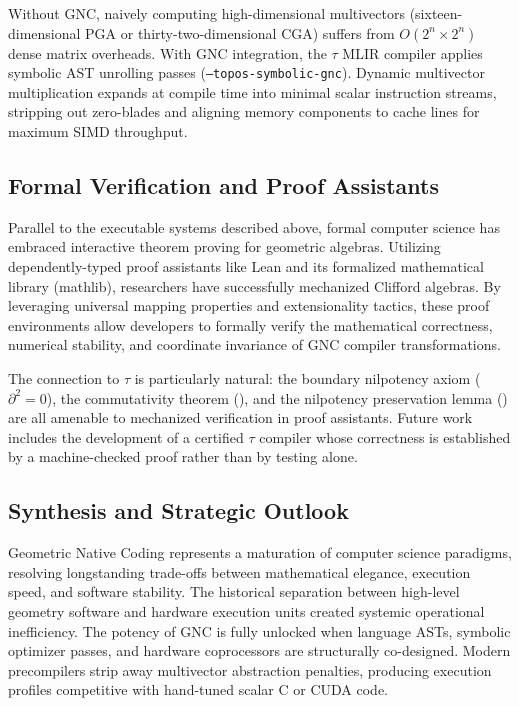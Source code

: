 \documentclass[manuscript, nonacm, review=false]{acmart}
\theoremstyle{definition}
\theoremstyle{plain}
\newcommand{\toposLang}{\ensuremath{\tau}\text{-Lang}}
\begin{document}
Without GNC, naively computing high-dimensional multivectors (sixteen-dimensional PGA or thirty-two-dimensional CGA) suffers from $O(2^n \times 2^n)$ dense matrix overheads. With GNC integration, the \toposLang{} MLIR compiler applies symbolic AST unrolling passes (\texttt{--topos-symbolic-gnc}). Dynamic multivector multiplication expands at compile time into minimal scalar instruction streams, stripping out zero-blades and aligning memory components to cache lines for maximum SIMD throughput.


\subsection{Formal Verification and Proof Assistants}
\label{subsec:formal_verification}

Parallel to the executable systems described above, formal computer science has embraced interactive theorem proving for geometric algebras. Utilizing dependently-typed proof assistants like Lean and its formalized mathematical library (mathlib), researchers have successfully mechanized Clifford algebras. By leveraging universal mapping properties and extensionality tactics, these proof environments allow developers to formally verify the mathematical correctness, numerical stability, and coordinate invariance of GNC compiler transformations.

The connection to \toposLang{} is particularly natural: the boundary nilpotency axiom ($\partial^2 = 0$), the commutativity theorem (), and the nilpotency preservation lemma () are all amenable to mechanized verification in proof assistants. Future work includes the development of a certified \toposLang{} compiler whose correctness is established by a machine-checked proof rather than by testing alone.


\subsection{Synthesis and Strategic Outlook}
\label{subsec:strategic_outlook}

Geometric Native Coding represents a maturation of computer science paradigms, resolving longstanding trade-offs between mathematical elegance, execution speed, and software stability. The historical separation between high-level geometry software and hardware execution units created systemic operational inefficiency. The potency of GNC is fully unlocked when language ASTs, symbolic optimizer passes, and hardware coprocessors are structurally co-designed. Modern precompilers strip away multivector abstraction penalties, producing execution profiles competitive with hand-tuned scalar C or CUDA code.
\end{document}
